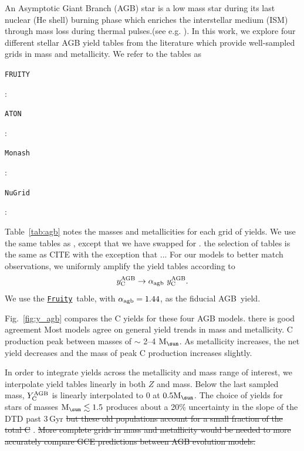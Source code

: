 \documentclass[fleqn,
usenatbib]{mnras}
\newcommand{\fruity}{\texttt{\hyperlink{fruity}{Fruity}}}
\newcommand{\cfactor}{1.44}
\newcommand{\agb}{AGB}
\newcommand{\Ycagb}{{y_{\rm C}^{\rm AGB}}}
\newcommand{\Mo}{ {\rm M}_{\sun}}
\newcommand{\strike}[1]{{\color{ForestGreen} \sout{#1}}}
\newcommand{\dbstrike}[1]{{\color{Thistle} \sout{#1} }}
\newcommand{\dbadd}[1]{{\color{Thistle} #1}}
\begin{document}
An Asymptotic Giant Branch (AGB) star is a low mass star during its last nuclear (He shell) burning phase which enriches the interstellar medium (ISM) through mass loss during thermal pulses.(see e.g. \citealt{PR2023}). 
In this work, we explore four different stellar AGB yield tables from the literature which provide well-sampled grids in mass and metallicity. We refer to the tables as 
\begin{description}
    \item \hypertarget{fruity}{\texttt{FRUITY}}: \citet{cristallo+11, cristallo+15}
    \item \hypertarget{aton}{\texttt{ATON}}: \citet{ventura+13,ventura+14,ventura+18, ventura+20}
    \item \hypertarget{monash}{\texttt{Monash}}: \citet{KL16, karakas+18}
    \item \hypertarget{nugrid}{\texttt{NuGrid}}: \citet{pignatari+16, ritter+18, battino+19, battino+21}
\end{description}
Table~\ref{tab:agb} notes the masses and metallicities for each grid of yields.
We use the same tables as \citet{james+23}, except that we have swapped \citet{karakas10} for \citet{pignatari+16}. \dbadd{the selection of tables is the same as CITE with the exception that ...}
For our models to better match observations, we uniformly amplify the yield tables according to
\begin{equation} \label{eq:alpha}
        \Ycagb \rightarrow \alpha_{\rm agb}\ \Ycagb.
\end{equation}
We use the \fruity\ table, with $\alpha_{\rm agb}=\cfactor$, as the fiducial \agb\ yield.

Fig.~\ref{fig:y_agb} compares the C yields for these four AGB models.
\dbadd{there is good agreement} Most models agree on general yield trends in mass and metallicity.
C production peak between masses of $\sim$ 2--4 $\Mo$. As metallicity increases, the net yield decreases and the mass of peak C production increases slightly.

In order to integrate yields across the metallicity and mass range of interest, we interpolate yield tables linearly in both $Z$ and mass. Below the last sampled mass, $Y_{\rm C}^{\rm AGB}$ is linearly interpolated to 0 at $0.5\Mo$. The choice of yields for stars of masses $\Mo \lesssim 1.5$ produces about a 20\% uncertainty in the slope of the DTD past 3\,Gyr \dbstrike{but these old populations account for a small fraction of the total C}. \strike{More complete grids in mass and metallicity would be needed to more accurately compare GCE predictions between AGB evolution models. }
\end{document}
